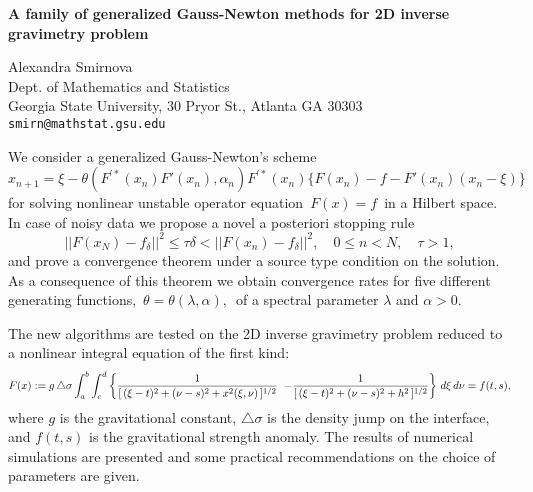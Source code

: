 \documentclass{report}
\begin{document}

\begin{center}
{\large
{\bf A family of generalized Gauss-Newton methods for 2D inverse \\
	gravimetry problem}}

	Alexandra Smirnova \\
	Dept. of Mathematics and Statistics \\
	Georgia State University, 30 Pryor St.,  Atlanta GA 30303 \\
	{\tt smirn@mathstat.gsu.edu}
\end{center}
We consider a generalized Gauss-Newton's scheme
$$ x_{n+1}=\xi-\theta(F^{\prime*}(x_n)F'(x_n),\alpha_n)
F^{\prime*}(x_n)\{F(x_n)-f-F'(x_n)(x_n-\xi)\} $$ for
solving nonlinear unstable operator equation
$\,F(x)=f\,$ in a Hilbert space. In case of noisy data
we propose a novel a posteriori stopping rule $$
||F(x_N)-f_\delta||^2\le \tau \delta <
||F(x_n)-f_\delta||^2,\quad 0\le n< N,\quad
\tau >1, $$
and
prove a convergence theorem under a source type
condition on the solution. As a consequence of this
theorem we obtain convergence rates for five different
generating functions,
$\,\theta=\theta(\lambda,\alpha),\,$ of a spectral
parameter $\lambda$ and $\alpha>0$.

The new algorithms are tested on the 2D inverse
gravimetry problem reduced to a nonlinear integral
equation of the first kind: $$ F(x):=g \,\triangle
\sigma \int^b_a\int^d_c\left\{
\frac{1}{[\,(\xi-t)^2+(\nu-s)^2+x^2(\xi,\nu)\,]^{1/2}}
\right.  \\ \left.  -
\frac{1}{[\,(\xi-t)^2+(\nu-s)^2+h^2\,]^{1/2}}
\right\}\,d\xi\,d\nu = f(t,s), $$ where $g$ is the
gravitational constant, $\triangle \sigma$ is the
density jump on the interface, and $f(t,s)$ is the
gravitational strength anomaly.  The results of
numerical simulations are presented and some practical
recommendations on the choice of parameters are given.



\end{document}
